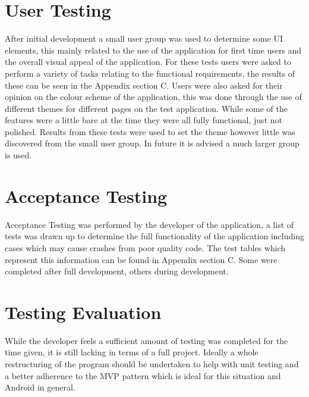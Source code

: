 \section{User Testing}
After initial development a small user group was used to determine some UI elements, this mainly related to the use of the application for first time users and the overall visual appeal of the application. For these tests users were asked to perform a variety of tasks relating to the functional requirements, the results of these can be seen in the Appendix section C. Users were also asked for their opinion on the colour scheme of the application, this was done through the use of different themes for different pages on the test application. While some of the features were a little bare at the time they were all fully functional, just not polished. Results from these tests were used to set the theme however little was discovered from the small user group. In future it is advised a much larger group is used.
\section{Acceptance Testing}
Acceptance Testing was performed by the developer of the application, a list of tests was drawn up to determine the full functionality of the application including cases which may cause crashes from poor quality code. The test tables which represent this information can be found in Appendix section C. Some were completed after full development, others during development.
\section{Testing Evaluation}
While the developer feels a sufficient amount of testing was completed for the time given, it is still lacking in terms of a full project. Ideally a whole restructuring of the program should be undertaken to help with unit testing and a better adherence to the MVP pattern which is ideal for this situation and Android in general. 